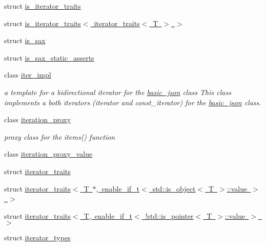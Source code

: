 \begin{DoxyCompactItemize}
\item 
struct \mbox{\hyperlink{structnlohmann_1_1detail_1_1is__iterator__traits}{is\+\_\+iterator\+\_\+traits}}
\item 
struct \mbox{\hyperlink{structnlohmann_1_1detail_1_1is__iterator__traits_3_01iterator__traits_3_01T_01_4_01_4}{is\+\_\+iterator\+\_\+traits$<$ iterator\+\_\+traits$<$ T $>$ $>$}}
\item 
struct \mbox{\hyperlink{structnlohmann_1_1detail_1_1is__sax}{is\+\_\+sax}}
\item 
struct \mbox{\hyperlink{structnlohmann_1_1detail_1_1is__sax__static__asserts}{is\+\_\+sax\+\_\+static\+\_\+asserts}}
\item 
class \mbox{\hyperlink{classnlohmann_1_1detail_1_1iter__impl}{iter\+\_\+impl}}
\begin{DoxyCompactList}\small\item\em a template for a bidirectional iterator for the \mbox{\hyperlink{classnlohmann_1_1basic__json}{basic\+\_\+json}} class This class implements a both iterators (iterator and const\+\_\+iterator) for the \mbox{\hyperlink{classnlohmann_1_1basic__json}{basic\+\_\+json}} class. \end{DoxyCompactList}\item 
class \mbox{\hyperlink{classnlohmann_1_1detail_1_1iteration__proxy}{iteration\+\_\+proxy}}
\begin{DoxyCompactList}\small\item\em proxy class for the items() function \end{DoxyCompactList}\item 
class \mbox{\hyperlink{classnlohmann_1_1detail_1_1iteration__proxy__value}{iteration\+\_\+proxy\+\_\+value}}
\item 
struct \mbox{\hyperlink{structnlohmann_1_1detail_1_1iterator__traits}{iterator\+\_\+traits}}
\item 
struct \mbox{\hyperlink{structnlohmann_1_1detail_1_1iterator__traits_3_01T_01_5_00_01enable__if__t_3_01std_1_1is__object_3_01T_01_4_1_1value_01_4_01_4}{iterator\+\_\+traits$<$ T $\ast$, enable\+\_\+if\+\_\+t$<$ std\+::is\+\_\+object$<$ T $>$\+::value $>$ $>$}}
\item 
struct \mbox{\hyperlink{structnlohmann_1_1detail_1_1iterator__traits_3_01T_00_01enable__if__t_3_01_9std_1_1is__pointer_3_01T_01_4_1_1value_01_4_01_4}{iterator\+\_\+traits$<$ T, enable\+\_\+if\+\_\+t$<$ !std\+::is\+\_\+pointer$<$ T $>$\+::value $>$ $>$}}
\item 
struct \mbox{\hyperlink{structnlohmann_1_1detail_1_1iterator__types}{iterator\+\_\+types}}

\end{DoxyCompactItemize}
